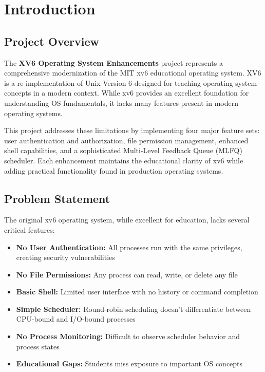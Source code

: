 \documentclass[a4paper,12pt]{report}
\begin{document}
\newpage
{}
\tableofcontents
\listoffigures
\listoftables

\newpage
{}

\chapter{Introduction}
\thispagestyle{contentpages}
\justifying

\section{Project Overview}

The \textbf{XV6 Operating System Enhancements} project represents a comprehensive modernization of the MIT xv6 educational operating system. XV6 is a re-implementation of Unix Version 6 designed for teaching operating system concepts in a modern context. While xv6 provides an excellent foundation for understanding OS fundamentals, it lacks many features present in modern operating systems.

This project addresses these limitations by implementing four major feature sets: user authentication and authorization, file permission management, enhanced shell capabilities, and a sophisticated Multi-Level Feedback Queue (MLFQ) scheduler. Each enhancement maintains the educational clarity of xv6 while adding practical functionality found in production operating systems.

\section{Problem Statement}

The original xv6 operating system, while excellent for education, lacks several critical features:

\begin{itemize}
    \item \textbf{No User Authentication:} All processes run with the same privileges, creating security vulnerabilities
    \item \textbf{No File Permissions:} Any process can read, write, or delete any file
    \item \textbf{Basic Shell:} Limited user interface with no history or command completion
    \item \textbf{Simple Scheduler:} Round-robin scheduling doesn't differentiate between CPU-bound and I/O-bound processes
    \item \textbf{No Process Monitoring:} Difficult to observe scheduler behavior and process states
    \item \textbf{Educational Gaps:} Students miss exposure to important OS concepts
\end{itemize}
\end{document}
